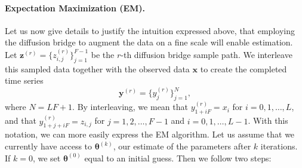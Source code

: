 \documentclass{article}
\newcommand{\btheta}{\ensuremath{\bm{\theta}}}
\newcommand{\bx}{\ensuremath{\mathbf{x}}}
\newcommand{\by}{\ensuremath{\mathbf{y}}}
\newcommand{\bz}{\ensuremath{\mathbf{z}}}
\begin{document}
\paragraph{Expectation Maximization (EM).} Let us now give details to justify the intuition expressed above, that employing the diffusion bridge to augment the data on a fine scale will enable estimation.  Let $\bz^{(r)} = \{z_{i,j}^{(r)}\}_{j=1}^{F-1}$ be the $r$-th diffusion bridge sample path.  We interleave this sampled data together with the observed data $\bx$ to create the completed time series
\begin{equation*}
\by^{(r)} = \{y_j^{(r)}\}_{j=1}^N,
\end{equation*}
where $N = LF + 1$.  By interleaving, we mean that $y_{1 + i F}^{(r)} = x_i$ for $i = 0, 1, \ldots, L$, and that $y_{1 + j + i F}^{(r)} = z_{i, j}$ for $j = 1, 2, \ldots, F-1$ and $i = 0, 1, \ldots, L-1$.  With this notation, we can more easily express the EM algorithm.  Let us assume that we currently have access to $\btheta^{(k)}$, our estimate of the parameters after $k$ iterations.  If $k=0$, we set $\btheta^{(0)}$ equal to an initial guess.  Then we follow two steps:
\end{document}
